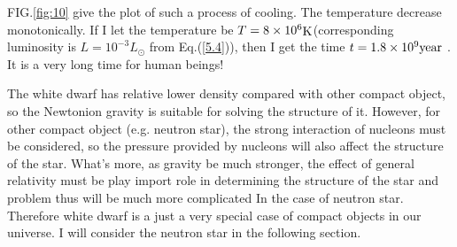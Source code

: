 \documentclass[preprint]{revtex4-1}
\begin{document}
FIG.\ref{fig:10} give the plot of such a process of cooling. The temperature decrease monotonically. If I let the temperature be $T = 8 \times {10^6}{\mathop{\rm K}\nolimits} $(corresponding luminosity is $L=10^{-3}L_{\odot}$  from Eq.(\ref{5.4})), then I get the time $t = 1.8 \times {10^9}{\mathop{\rm year}\nolimits} $ . It is a very long time for human beings!\par
The white dwarf has relative lower density compared with other compact object, so the Newtonion gravity is suitable for solving the structure of it. However, for other compact object (e.g. neutron star), the strong interaction of nucleons must be considered, so the pressure provided by nucleons will also affect the structure of the star. What’s more, as gravity be much stronger, the effect of general relativity must be play import role in determining the structure of the star and problem thus will be much more complicated In the case of neutron star. Therefore white dwarf is a just a very special case of compact objects in our universe. I will consider the neutron star in the following section.
\end{document}
